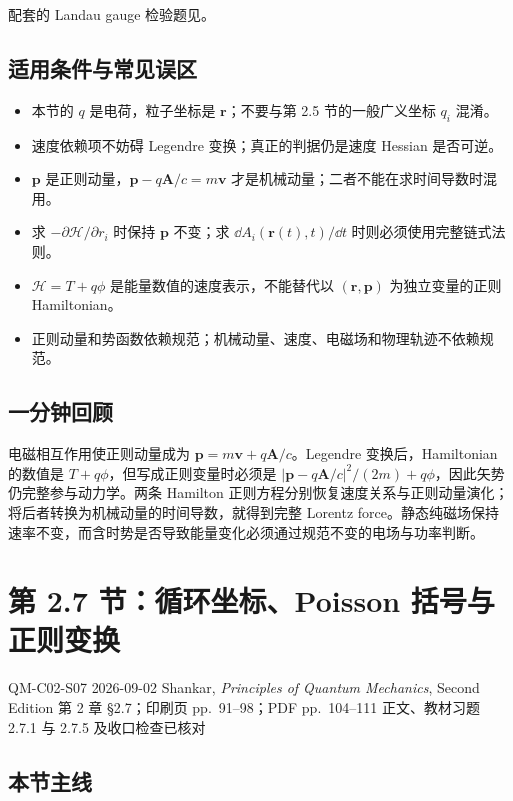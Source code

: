 配套的 Landau gauge 检验题见。

\subsection{适用条件与常见误区}

\begin{itemize}[leftmargin=*]
  \item 本节的 $q$ 是电荷，粒子坐标是 $\bm r$；不要与第 2.5 节的一般广义坐标 $q_i$ 混淆。
  \item 速度依赖项不妨碍 Legendre 变换；真正的判据仍是速度 Hessian 是否可逆。
  \item $\bm p$ 是正则动量，$\bm p-q\bm A/c=m\bm v$ 才是机械动量；二者不能在求时间导数时混用。
  \item 求 $-\partial\mathcal H/\partial r_i$ 时保持 $\bm p$ 不变；求 $\dd A_i(\bm r(t),t)/\dd t$ 时则必须使用完整链式法则。
  \item $\mathcal H=T+q\phi$ 是能量数值的速度表示，不能替代以 $(\bm r,\bm p)$ 为独立变量的正则 Hamiltonian。
  \item 正则动量和势函数依赖规范；机械动量、速度、电磁场和物理轨迹不依赖规范。
\end{itemize}

\subsection{一分钟回顾}

电磁相互作用使正则动量成为 $\bm p=m\bm v+q\bm A/c$。Legendre 变换后，Hamiltonian 的数值是 $T+q\phi$，但写成正则变量时必须是 $|\bm p-q\bm A/c|^2/(2m)+q\phi$，因此矢势仍完整参与动力学。两条 Hamilton 正则方程分别恢复速度关系与正则动量演化；将后者转换为机械动量的时间导数，就得到完整 Lorentz force。静态纯磁场保持速率不变，而含时势是否导致能量变化必须通过规范不变的电场与功率判断。

\section{第 2.7 节：循环坐标、Poisson 括号与正则变换}
\label{section:QM-C02-S07}

\studymeta
  {QM-C02-S07}
  {2026-09-02}
  {Shankar, \textit{Principles of Quantum Mechanics}, Second Edition}
  {第 2 章 \S 2.7；印刷页 pp.~91--98；PDF pp.~104--111}
  {正文、教材习题 2.7.1 与 2.7.5 及收口检查已核对}

\subsection{本节主线}

